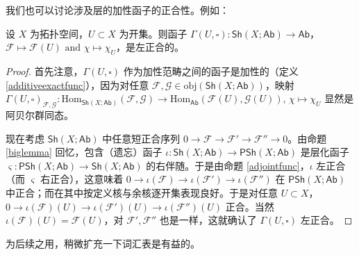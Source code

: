 我们也可以讨论涉及层的加性函子的正合性。例如：

\begin{Lem}\label{sectfuncexact}
设 $X$ 为拓扑空间，$U\subset X$ 为开集。则函子 $\Gamma(U,\square):\mathsf{Sh}(X;\mathsf{Ab})\rightarrow\mathsf{Ab}$，$\mathcal{F}\mapsto\mathcal{F}(U)\text{ and } \chi\mapsto\chi_U$，是左正合的。
\end{Lem}

\begin{proof}
首先注意，$\Gamma(U,\square)$ 作为加性范畴之间的函子是加性的（定义 \ref{additiveexactfunc}），因为对任意 $\mathcal{F},\mathcal{G}\in\text{obj}(\mathsf{Sh}(X;\mathsf{Ab}))$，映射 $\Gamma(U,\square)_{\mathcal{F},\mathcal{G}}:\text{Hom}_{\mathsf{Sh}(X;\mathsf{Ab})}(\mathcal{F},\mathcal{G})\rightarrow\text{Hom}_\mathsf{Ab}(\mathcal{F}(U),\mathcal{G}(U)),\,\chi\mapsto\chi_U$ 显然是阿贝尔群同态。

现在考虑 $\mathsf{Sh}(X;\mathsf{Ab})$ 中任意短正合序列 $0\rightarrow\mathcal{F}\rightarrow\mathcal{F}'\rightarrow\mathcal{F}''\rightarrow 0$。由命题 \ref{biglemma} 回忆，包含（遗忘）函子 $\iota:\mathsf{Sh}(X;\mathsf{Ab})\rightarrow\mathsf{PSh}(X;\mathsf{Ab})$ 是层化函子 $\varsigma:\mathsf{PSh}(X;\mathsf{Ab})\rightarrow\mathsf{Sh}(X;\mathsf{Ab})$ 的右伴随。于是由命题 \ref{adjointfunc}，$\iota$ 左正合（而 $\varsigma$ 右正合），这意味着 $0\rightarrow\iota(\mathcal{F})\rightarrow\iota(\mathcal{F}')\rightarrow\iota(\mathcal{F}'')$ 在 $\mathsf{PSh}(X;\mathsf{Ab})$ 中正合；而在其中按定义核与余核逐开集表现良好。于是对任意 $U\subset X$，$0\rightarrow\iota(\mathcal{F})(U)\rightarrow\iota(\mathcal{F}')(U)\rightarrow\iota(\mathcal{F}'')(U)$ 正合。当然 $\iota(\mathcal{F})(U)=\mathcal{F}(U)$，对 $\mathcal{F}',\mathcal{F}''$ 也是一样，这就确认了 $\Gamma(U,\square)$ 左正合。
\end{proof}

为后续之用，稍微扩充一下词汇表是有益的。

